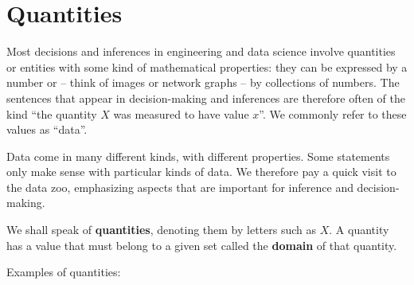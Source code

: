 \documentclass[
  a4paper,
  DIV=11,
  numbers=noendperiod,
  oneside]{scrreprt}
\begin{document}
\providecommand{\ul}{\uline}
\renewcommand*{\|}[1][]{\nonscript\:#1\vert\nonscript\:\mathopen{}}
\providecommand*{\pr}[1]{\textsf{\small`#1'}}
\renewcommand*{\pr}[1]{\textsf{\small`#1'}}
\providecommand*{\prq}[1]{\textsf{\small #1}}
\renewcommand*{\prq}[1]{\textsf{\small #1}}
\providecommand{\se}[1]{\mathsfit{#1}}
\renewcommand{\se}[1]{\mathsfit{#1}}
\providecommand{\p}{\mathrm{p}}
\renewcommand{\p}{\mathrm{p}}
\renewcommand{\P}{\mathrm{P}}

\providecommand*{\mo}[1][=]{\mathord{\,#1\,}}
\providecommand*{\yX}{\se{X}}
\providecommand*{\yY}{\se{Y}}
\providecommand*{\yI}{\se{I}}

\hypertarget{quantities}{%
\section{Quantities}\label{quantities}}

Most decisions and inferences in engineering and data science involve
quantities or entities with some kind of mathematical properties: they
can be expressed by a number or -- think of images or network graphs --
by collections of numbers. The sentences that appear in decision-making
and inferences are therefore often of the kind ``the quantity \(X\) was
measured to have value \(x\)''. We commonly refer to these values as
``data''.

Data come in many different kinds, with different properties. Some
statements only make sense with particular kinds of data. We therefore
pay a quick visit to the data zoo, emphasizing aspects that are
important for inference and decision-making.

We shall speak of {\textbf{quantities}}, denoting them by letters such
as \(X\). A quantity has a value that must belong to a given set called
the {\textbf{domain}} of that quantity.

Examples of quantities:
\end{document}
